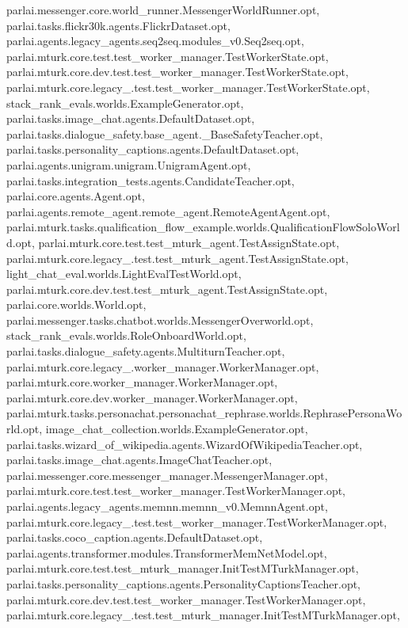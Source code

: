 parlai.\+messenger.\+core.\+world\+\_\+runner.\+Messenger\+World\+Runner.\+opt, parlai.\+tasks.\+flickr30k.\+agents.\+Flickr\+Dataset.\+opt, parlai.\+agents.\+legacy\+\_\+agents.\+seq2seq.\+modules\+\_\+v0.\+Seq2seq.\+opt, parlai.\+mturk.\+core.\+test.\+test\+\_\+worker\+\_\+manager.\+Test\+Worker\+State.\+opt, parlai.\+mturk.\+core.\+dev.\+test.\+test\+\_\+worker\+\_\+manager.\+Test\+Worker\+State.\+opt, parlai.\+mturk.\+core.\+legacy\+\_.\+test.\+test\+\_\+worker\+\_\+manager.\+Test\+Worker\+State.\+opt, stack\+\_\+rank\+\_\+evals.\+worlds.\+Example\+Generator.\+opt, parlai.\+tasks.\+image\+\_\+chat.\+agents.\+Default\+Dataset.\+opt, parlai.\+tasks.\+dialogue\+\_\+safety.\+base\+\_\+agent.\+\_\+\+Base\+Safety\+Teacher.\+opt, parlai.\+tasks.\+personality\+\_\+captions.\+agents.\+Default\+Dataset.\+opt, parlai.\+agents.\+unigram.\+unigram.\+Unigram\+Agent.\+opt, parlai.\+tasks.\+integration\+\_\+tests.\+agents.\+Candidate\+Teacher.\+opt, parlai.\+core.\+agents.\+Agent.\+opt, parlai.\+agents.\+remote\+\_\+agent.\+remote\+\_\+agent.\+Remote\+Agent\+Agent.\+opt, parlai.\+mturk.\+tasks.\+qualification\+\_\+flow\+\_\+example.\+worlds.\+Qualification\+Flow\+Solo\+World.\+opt, parlai.\+mturk.\+core.\+test.\+test\+\_\+mturk\+\_\+agent.\+Test\+Assign\+State.\+opt, parlai.\+mturk.\+core.\+legacy\+\_.\+test.\+test\+\_\+mturk\+\_\+agent.\+Test\+Assign\+State.\+opt, light\+\_\+chat\+\_\+eval.\+worlds.\+Light\+Eval\+Test\+World.\+opt, parlai.\+mturk.\+core.\+dev.\+test.\+test\+\_\+mturk\+\_\+agent.\+Test\+Assign\+State.\+opt, parlai.\+core.\+worlds.\+World.\+opt, parlai.\+messenger.\+tasks.\+chatbot.\+worlds.\+Messenger\+Overworld.\+opt, stack\+\_\+rank\+\_\+evals.\+worlds.\+Role\+Onboard\+World.\+opt, parlai.\+tasks.\+dialogue\+\_\+safety.\+agents.\+Multiturn\+Teacher.\+opt, parlai.\+mturk.\+core.\+legacy\+\_.\+worker\+\_\+manager.\+Worker\+Manager.\+opt, parlai.\+mturk.\+core.\+worker\+\_\+manager.\+Worker\+Manager.\+opt, parlai.\+mturk.\+core.\+dev.\+worker\+\_\+manager.\+Worker\+Manager.\+opt, parlai.\+mturk.\+tasks.\+personachat.\+personachat\+\_\+rephrase.\+worlds.\+Rephrase\+Persona\+World.\+opt, image\+\_\+chat\+\_\+collection.\+worlds.\+Example\+Generator.\+opt, parlai.\+tasks.\+wizard\+\_\+of\+\_\+wikipedia.\+agents.\+Wizard\+Of\+Wikipedia\+Teacher.\+opt, parlai.\+tasks.\+image\+\_\+chat.\+agents.\+Image\+Chat\+Teacher.\+opt, parlai.\+messenger.\+core.\+messenger\+\_\+manager.\+Messenger\+Manager.\+opt, parlai.\+mturk.\+core.\+test.\+test\+\_\+worker\+\_\+manager.\+Test\+Worker\+Manager.\+opt, parlai.\+agents.\+legacy\+\_\+agents.\+memnn.\+memnn\+\_\+v0.\+Memnn\+Agent.\+opt, parlai.\+mturk.\+core.\+legacy\+\_.\+test.\+test\+\_\+worker\+\_\+manager.\+Test\+Worker\+Manager.\+opt, parlai.\+tasks.\+coco\+\_\+caption.\+agents.\+Default\+Dataset.\+opt, parlai.\+agents.\+transformer.\+modules.\+Transformer\+Mem\+Net\+Model.\+opt, parlai.\+mturk.\+core.\+test.\+test\+\_\+mturk\+\_\+manager.\+Init\+Test\+M\+Turk\+Manager.\+opt, parlai.\+tasks.\+personality\+\_\+captions.\+agents.\+Personality\+Captions\+Teacher.\+opt, parlai.\+mturk.\+core.\+dev.\+test.\+test\+\_\+worker\+\_\+manager.\+Test\+Worker\+Manager.\+opt, parlai.\+mturk.\+core.\+legacy\+\_.\+test.\+test\+\_\+mturk\+\_\+manager.\+Init\+Test\+M\+Turk\+Manager.\+opt, 